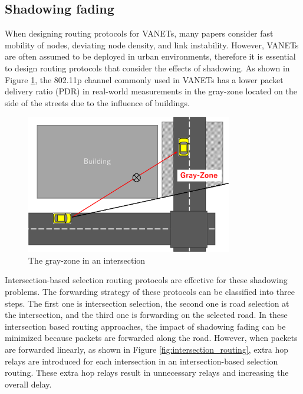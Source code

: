 \documentclass[conference]{IEEEtran}
\begin{document}
\subsection{Shadowing fading}
When designing routing protocols for VANETs, many papers consider fast mobility of nodes, deviating node density, and link instability. 
However, VANETs are often assumed to be deployed in urban environments, therefore it is essential to design routing protocols that consider the effects of shadowing.  
As shown in Figure \ref{fig:Gray-Zone}, the 802.11p channel commonly used in VANETs has a lower packet delivery ratio (PDR) in real-world measurements in the gray-zone \cite{17} located on the side of the streets due to the influence of buildings.

\begin{figure}[!ht]
\centering
\includegraphics[width=90mm]{figures/Gray-Zone.eps}
\caption{The gray-zone in an intersection }
\label{fig:Gray-Zone}
\end{figure}



Intersection-based selection routing protocols \cite{24,25,26}  are effective for these shadowing problems.
The forwarding strategy of these protocols can be classified into three steps. The first one is intersection selection, the second one is road selection at the intersection, and the third one is forwarding on the selected road. 
In these intersection based routing approaches, the impact of shadowing fading can be minimized because packets are forwarded along the road.
However, when packets are forwarded linearly,  as shown in Figure \ref{fig:intersection_routing}, extra hop relays are introduced for each intersection in an intersection-based selection routing. These extra hop relays result in unnecessary relays and increasing the overall delay.
\end{document}

